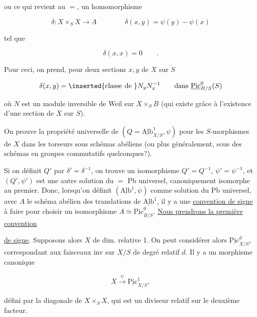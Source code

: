 ou ce qui revient au $=$, un homomorphisme

\[
\delta\colon X\times_S X\longrightarrow A\qquad\qquad\delta(x,y)=\psi(y)-\psi(x)
\]

tel que

\[
\delta(x,x)=0\qquad.
\]

Pour ceci, on prend, pour deux sections $x,y$ de $X$ sur $S$

\[
\delta(x,y)=\inserted{\text{classe de }}N_yN_x^{-1}\qquad\text{dans }\underline{\mathrm{Pic}}^0_{B/S}(S)
\]

où $N$ est un module inversible de Weil sur $X\times_S B$ (qui existe grâce à l'existence d'une section de $X$ sur $S$).

On prouve la propriété universelle de $(Q=\underline{\mathrm{Alb}}^1_{X/S},\psi)$ pour les $S$-morphismes de $X$ dans les  torseurs sous schémas abéliens (ou plus généralement, sous des schémas en groupes commutatifs quelconques?).

Si on définit $Q'$ par $\delta'=\delta^{-1}$, on trouve un isomorphisme $Q'=Q^{-1}$, $\psi'=\psi^{-1}$, et $(Q',\psi')$ est une autre solution du $=$ Pb universel, canoniquement isomorphe au premier. Donc, lorsqu'on définit $(\underline{\mathrm{Alb}}^1,\psi)$ comme solution du Pb universel, avec $A$ le schéma abélien des translations de $\underline{\mathrm{Alb}}^1$, il y a une \uline{convention de signe} à faire pour choisir un isomorphisme $A\simeq\underline{\mathrm{Pic}}^0_{B/S}$. \uline{Nous prendrons la première convention}

\uline{de signe}. Supposons alors $X$  de dim. relative 1. On peut considérer alors $\underline{\mathrm{Pic}}^d_{X/S}$,  correspondant aux faisceaux inv sur $X/S$ de degré relatif $d$. Il y a un morphisme canonique

\[
X\xrightarrow{\psi}\underline{\mathrm{Pic}}^1_{X/S},
\]

 défini par la diagonale de $X\times_S X$, qui est un diviseur relatif sur le deuxième facteur.


